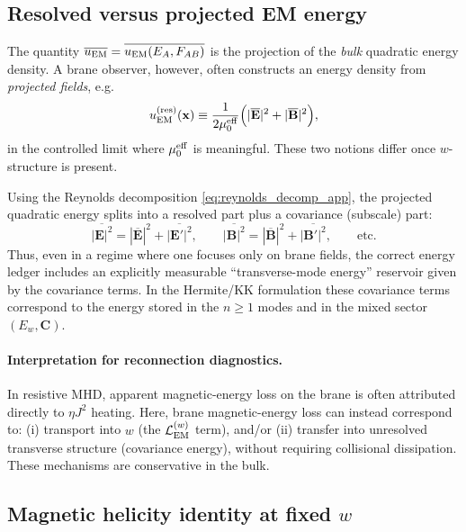 \documentclass[11pt]{article}
\begin{document}
\subsection{Resolved versus projected EM energy}
\label{app:resolved_vs_projected_energy}

The quantity \(\overline{u_{\rm EM}}=\overline{u_{\rm EM}(E_A,F_{AB})}\) is the
projection of the \emph{bulk} quadratic energy density. A brane observer, however,
often constructs an energy density from \emph{projected fields}, e.g.
\begin{equation}
u_{\rm EM}^{\rm (res)}(\mathbf{x})
\equiv
\frac{1}{2\mu_0^{\rm eff}}
\Big(
|\overline{\mathbf{E}}|^2 + |\overline{\mathbf{B}}|^2
\Big),
\label{eq:resolved_energy_def_app}
\end{equation}
in the controlled limit where \(\mu_0^{\rm eff}\) is meaningful. These two notions differ
once \(w\)-structure is present.

Using the Reynolds decomposition \eqref{eq:reynolds_decomp_app}, the projected quadratic energy
splits into a resolved part plus a covariance (subscale) part:
\begin{equation}
\overline{|\mathbf{E}|^2}
=
|\overline{\mathbf{E}}|^2 + \overline{|\mathbf{E}'|^2},
\qquad
\overline{|\mathbf{B}|^2}
=
|\overline{\mathbf{B}}|^2 + \overline{|\mathbf{B}'|^2},
\qquad\text{etc.}
\label{eq:energy_reynolds_split_app}
\end{equation}
Thus, even in a regime where one focuses only on brane fields, the correct energy ledger
includes an explicitly measurable ``transverse-mode energy'' reservoir given by the covariance
terms. In the Hermite/KK formulation these covariance terms correspond to the energy stored in
the \(n\ge 1\) modes and in the mixed sector \((E_w,\mathbf{C})\).

\paragraph{Interpretation for reconnection diagnostics.}
In resistive MHD, apparent magnetic-energy loss on the brane is often attributed directly to
\(\eta J^2\) heating. Here, brane magnetic-energy loss can instead correspond to:
(i) transport into \(w\) (the \(\mathcal{L}_{\rm EM}^{(w)}\) term), and/or
(ii) transfer into unresolved transverse structure (covariance energy),
without requiring collisional dissipation. These mechanisms are conservative in the bulk.

\subsection{Magnetic helicity identity at fixed \texorpdfstring{\(w\)}{w}}
\label{app:helicity_identity}
\end{document}
